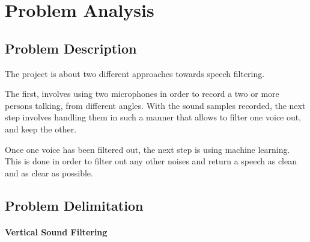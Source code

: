 \chapter{Problem Analysis}\label{ch:problemAnalysis}
\section{Problem Description}
The project is about two different approaches towards speech filtering.

The first, involves using two microphones in order to record a two or 
more persons talking, from different angles.
With the sound samples recorded, the next step involves handling them 
in such a manner that allows to filter one voice out, and keep the other.

Once one voice has been filtered out, the next step is using machine learning.
This is done in order to filter out any other noises and return a speech as clean
and as clear as possible.

\section{Problem Delimitation}
\subsubsection{Vertical Sound Filtering}
